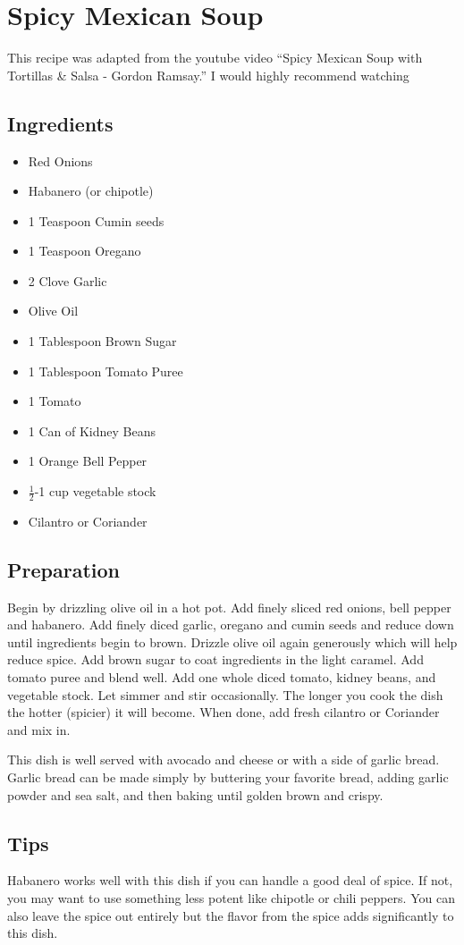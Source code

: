 \thispagestyle{fancy}
\section{Spicy Mexican Soup}
\AddToShipoutPicture*{\MexicanSoup}
This recipe was adapted from the youtube video ``Spicy Mexican Soup with Tortillas \& Salsa - Gordon Ramsay.'' I would highly recommend watching 
\subsection*{Ingredients}
\begin{multicols}{3}
	\begin{itemize}
		\item Red Onions
		\item Habanero (or chipotle)
		\item 1 Teaspoon Cumin seeds
		\item 1 Teaspoon Oregano
		\item 2 Clove Garlic
		\item Olive Oil
		\item 1 Tablespoon Brown Sugar
		\item 1 Tablespoon Tomato Puree
		\item 1 Tomato
		\item 1 Can of Kidney Beans
		\item 1 Orange Bell Pepper
		\item $\frac{1}{2}$-1 cup vegetable stock
		\item Cilantro or Coriander
	\end{itemize}
\end{multicols}

\subsection*{Preparation}

Begin by drizzling olive oil in a hot pot. Add finely sliced red onions, bell pepper and habanero. Add finely diced garlic, oregano and cumin seeds and reduce down until ingredients begin to brown. Drizzle olive oil again generously which will help reduce spice. Add brown sugar to coat ingredients in the light caramel. Add tomato puree and blend well. Add one whole diced tomato, kidney beans, and vegetable stock. Let simmer and stir occasionally. The longer you cook the dish the hotter (spicier) it will become. When done, add fresh cilantro or Coriander and mix in. 

This dish is well served with avocado and cheese or with a side of garlic bread. Garlic bread can be made simply by buttering your favorite bread, adding garlic powder and sea salt, and then baking until golden brown and crispy. 

\subsection*{Tips}

Habanero works well with this dish if you can handle a good deal of spice. If not, you may want to use something less potent like chipotle or chili peppers. You can also leave the spice out entirely but the flavor from the spice adds significantly to this dish.